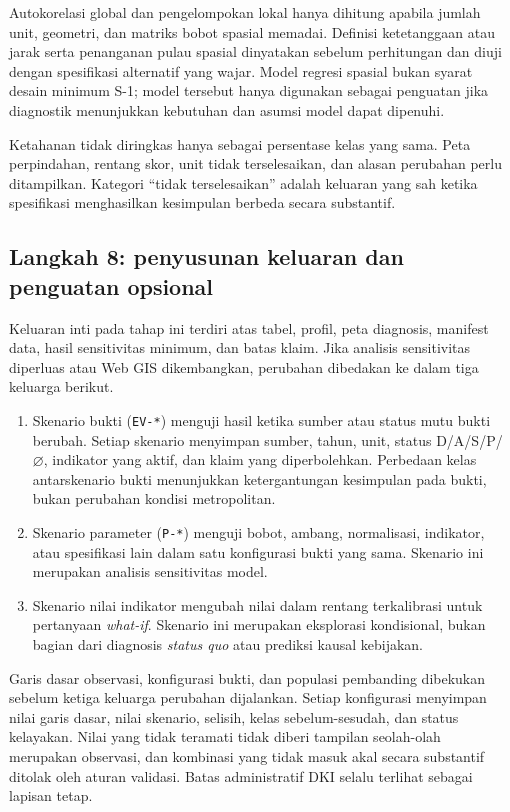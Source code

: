\documentclass[11pt,a4paper,oneside,openany,indonesian]{report}
\begin{document}
Autokorelasi global dan pengelompokan lokal hanya dihitung apabila
jumlah unit, geometri, dan matriks bobot spasial memadai. Definisi
ketetanggaan atau jarak serta penanganan pulau spasial dinyatakan
sebelum perhitungan dan diuji dengan spesifikasi alternatif yang wajar.
Model regresi spasial bukan syarat desain minimum S-1; model tersebut
hanya digunakan sebagai penguatan jika diagnostik menunjukkan kebutuhan
dan asumsi model dapat dipenuhi.

Ketahanan tidak diringkas hanya sebagai persentase kelas yang sama. Peta
perpindahan, rentang skor, unit tidak terselesaikan, dan alasan
perubahan perlu ditampilkan. Kategori ``tidak terselesaikan'' adalah
keluaran yang sah ketika spesifikasi menghasilkan kesimpulan berbeda
secara substantif.

\subsection{Langkah 8: penyusunan keluaran dan penguatan
opsional}\label{langkah-8-penyusunan-keluaran-dan-penguatan-opsional}

Keluaran inti pada tahap ini terdiri atas tabel, profil, peta diagnosis,
manifest data, hasil sensitivitas minimum, dan batas klaim. Jika analisis
sensitivitas diperluas atau Web GIS dikembangkan, perubahan dibedakan ke
dalam tiga keluarga berikut.

\begin{enumerate}
\def\labelenumi{\arabic{enumi}.}
\tightlist
\item
  Skenario bukti (\texttt{EV-*}) menguji hasil ketika sumber
  atau status mutu bukti berubah. Setiap skenario menyimpan sumber,
  tahun, unit, status D/A/S/P/\(\varnothing\), indikator yang aktif, dan
  klaim yang diperbolehkan. Perbedaan kelas antarskenario bukti
  menunjukkan ketergantungan kesimpulan pada bukti, bukan perubahan
  kondisi metropolitan.
\item
  Skenario parameter (\texttt{P-*}) menguji bobot, ambang,
  normalisasi, indikator, atau spesifikasi lain dalam satu konfigurasi
  bukti yang sama. Skenario ini merupakan analisis sensitivitas model.
\item
  Skenario nilai indikator mengubah nilai dalam rentang
  terkalibrasi untuk pertanyaan \emph{what-if}. Skenario ini merupakan
  eksplorasi kondisional, bukan bagian dari diagnosis \emph{status quo}
  atau prediksi kausal kebijakan.
\end{enumerate}

Garis dasar observasi, konfigurasi bukti, dan populasi pembanding
dibekukan sebelum ketiga keluarga perubahan dijalankan. Setiap
konfigurasi menyimpan nilai garis dasar, nilai skenario, selisih, kelas
sebelum-sesudah, dan status kelayakan. Nilai yang tidak teramati tidak
diberi tampilan seolah-olah merupakan observasi, dan kombinasi yang
tidak masuk akal secara substantif ditolak oleh aturan validasi. Batas
administratif DKI selalu terlihat sebagai lapisan tetap.
\end{document}
